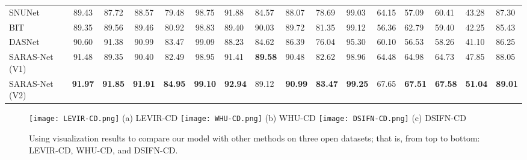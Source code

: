 \documentclass[letterpaper]{article} \usepackage{aaai23}  \usepackage{times}  \usepackage{helvet}  \usepackage{courier}  \usepackage[hyphens]{url}  \usepackage{graphicx} \urlstyle{rm} \def\UrlFont{\rm}  \usepackage{natbib}  \usepackage{caption} \frenchspacing  \setlength{\pdfpagewidth}{8.5in}  \setlength{\pdfpageheight}{11in}  \usepackage{algorithm}
\begin{document}
\begin{table*}[t]
{\begin{tabular}{l|ccccc|lllll|lllll}
SNUNet         & 89.43          & 87.72          & 88.57         & 79.48         & 98.75         & 91.88 & 84.57          & 88.07         & 78.69          & 99.03                   & 64.15 & 57.09          & 60.41         & 43.28          & 87.30                  \\
BIT              & 89.35          & 89.56          & 89.46     & 80.92          & 98.83        & 89.40 & 90.03          & 89.72 & 81.35          & 99.12                  & 56.36  & 62.79          & 59.40         & 42.25          & 85.43                   \\
DASNet          & 90.60          & 91.38           & 90.99            & 83.47          & 99.09          & 88.23                    & 84.62                    & 86.39                  & 76.04                   & 95.30                   & 60.10          &  56.53          &  58.26                  &  41.10                   &  86.25 \\
\hline
SARAS-Net (V1) & 91.48          & 89.35          & 90.40          & 82.49         & 98.95          & 91.41                    &  \textbf{89.58}                    & 90.48                 & 82.62                    & 98.96           & 64.48  & 64.98                     & 64.73         & 47.85           & 88.05                  \\
SARAS-Net (V2) & \textbf{91.97}           & \textbf{91.85} & \textbf{91.91} & \textbf{84.95} & \textbf{99.10}     & \textbf{92.94}   & 89.12           & \textbf{90.99}         & \textbf{83.47}           & \textbf{99.25}         & 67.65  & \textbf{67.51}                    & \textbf{67.58}        & \textbf{51.04}         & \textbf{89.01}          \\ \hline
\end{tabular}}
\label{accuracy}

\end{table*}

\begin{figure}[h]
\centering
\texttt{[image: LEVIR-CD.png]}
\footnotesize (a) LEVIR-CD
\texttt{[image: WHU-CD.png]}
\footnotesize (b) WHU-CD
\texttt{[image: DSIFN-CD.png]}
\footnotesize (c) DSIFN-CD
\caption{Using visualization results to compare our model with other methods on three open datasets; that is, from top to bottom: LEVIR-CD, WHU-CD, and DSIFN-CD.}
\label{dataset_result}
\end{figure}
\vspace{0.2cm}
\end{document}
